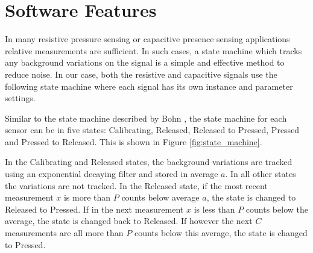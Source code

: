 \documentclass{sigchi-ext}
\begin{document}
\section{Software Features}
In many resistive pressure sensing or capacitive presence sensing applications relative measurements are sufficient. In such cases, a state machine which tracks any background variations on the signal is a simple and effective method to reduce noise. In our case, both the resistive and capacitive signals use the following state machine where each signal has its own instance and parameter settings. 

Similar to the state machine described by Bohn \cite{Bohn2009}, the state
machine for each sensor can be in five states: Calibrating, Released, Released
to Pressed, Pressed and Pressed to Released. This is shown in Figure
\ref{fig:state_machine}.

In the Calibrating and Released states, the background variations are tracked
using an exponential decaying filter and stored in average $a$. In all other
states the variations are not tracked. In the Released state, if the
most recent measurement $x$ is more than $P$ counts below average $a$, the state
is changed to Released to Pressed. If in the next measurement $x$ is less
than $P$ counts below the average, the state is changed back to Released. If
however the next $C$ measurements are all more than $P$ counts below this
average, the state is changed to Pressed.
\end{document}
